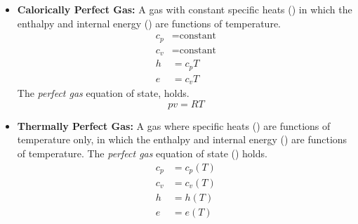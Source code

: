         \begin{itemize}
            \item \textbf{Calorically Perfect Gas:} A gas with constant
                specific heats () in which the enthalpy
                and internal energy ()
                are functions of temperature. 
            \begin{subequations}\label{eq:caloricallyPerfectGasAssumptions}
                \begin{align}
                    c_p &= \text{constant} \label{eq:caloricallyPerfectHeatCapP} \\
                    c_v &= \text{constant} \label{eq:caloricallyPerfectHeatCapV} \\
                    h & = c_p T \label{eq:caloricallyPerfectGasEnthalpy} \\
                    e & = c_v T \label{eq:caloricallyPerfectGasEnergy} 
                \end{align}
            \end{subequations}
            The \textit{perfect gas} equation of state,  holds.
            \begin{equation}\label{eq:equationOfState}
                pv = R T 
            \end{equation}
            \item \textbf{Thermally Perfect Gas:} A gas where specific heats ()
                are functions of temperature only, in which the enthalpy and
                internal energy ()
                are functions of temperature. The \textit{perfect gas} equation of state
                () holds.
            \begin{subequations}\label{eq:caloricallyPerfectGasAssumptions}
                \begin{align}
                    c_p &= c_p(T) \label{eq:thermallyPerfectHeatCapP} \\
                    c_v &= c_v(T) \label{eq:thermallyPerfectHeatCapV} \\
                    h & = h(T) \label{eq:thermallyPerfectGasEnthalpy} \\
                    e & = e(T) \label{eq:thermallyPerfectGasEnergy} 
                \end{align}

\end{subequations}
\end{itemize}
